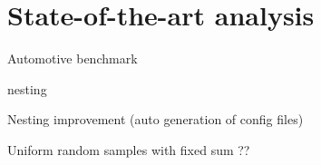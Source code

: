 \section{State-of-the-art analysis}
\label{sec:sota}
Automotive benchmark

nesting

Nesting improvement (auto generation of config files)

Uniform random samples with fixed sum ??